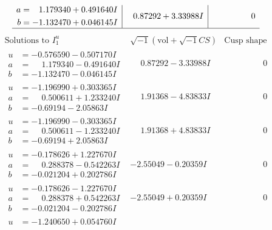 \documentclass[1p]{elsarticle_modified}
\theoremstyle{definition}
\newcommand{\I}{\sqrt{-1}}
\begin{document}
$$\begin{array}{c|c|c}
\begin{aligned}
a &= \phantom{-}1.179340 + 0.491640 I \\
b &= -1.132470 + 0.046145 I\end{aligned}
 & \phantom{-}0.87292 + 3.33988 I & \phantom{-0.000000 } 0\\
 \hline 
 \end{array}$$\newpage$$\begin{array}{c|c|c}  
\text{Solutions to }I^u_{1}& \I (\text{vol} + \sqrt{-1}CS) & \text{Cusp shape}\\
 \hline 
\begin{aligned}
u &= -0.576590 - 0.507170 I \\
a &= \phantom{-}1.179340 - 0.491640 I \\
b &= -1.132470 - 0.046145 I\end{aligned}
 & \phantom{-}0.87292 - 3.33988 I & \phantom{-0.000000 } 0 \\ \hline\begin{aligned}
u &= -1.196990 + 0.303365 I \\
a &= \phantom{-}0.500611 + 1.233240 I \\
b &= -0.69194 - 2.05863 I\end{aligned}
 & \phantom{-}1.91368 - 4.83833 I & \phantom{-0.000000 } 0 \\ \hline\begin{aligned}
u &= -1.196990 - 0.303365 I \\
a &= \phantom{-}0.500611 - 1.233240 I \\
b &= -0.69194 + 2.05863 I\end{aligned}
 & \phantom{-}1.91368 + 4.83833 I & \phantom{-0.000000 } 0 \\ \hline\begin{aligned}
u &= -0.178626 + 1.227670 I \\
a &= \phantom{-}0.288378 - 0.542263 I \\
b &= -0.021204 + 0.202786 I\end{aligned}
 & -2.55049 - 0.20359 I & \phantom{-0.000000 } 0 \\ \hline\begin{aligned}
u &= -0.178626 - 1.227670 I \\
a &= \phantom{-}0.288378 + 0.542263 I \\
b &= -0.021204 - 0.202786 I\end{aligned}
 & -2.55049 + 0.20359 I & \phantom{-0.000000 } 0 \\ \hline\begin{aligned}
u &= -1.240650 + 0.054760 I \\

\end{aligned}
\end{array}$$
\end{document}
